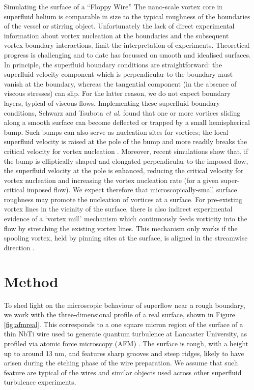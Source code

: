 \begin{chapter}{\label{cha:afm}Simulating the surface of a ``Floppy Wire''}
The nano-scale vortex core in superfluid helium is comparable in size 
to the typical roughness of the boundaries of the vessel or stirring object. 
Unfortunately the lack of direct experimental information about vortex 
nucleation at the boundaries and the subsequent vortex-boundary interactions,
limit the interpretation of experiments. Theoretical
progress is challenging and to date has focussed on smooth and idealised surfaces.  In principle, the superfluid boundary conditions
are straightforward:
the superfluid velocity
component which is perpendicular to the boundary must vanish
at the boundary, whereas the tangential component (in the absence of
viscous stresses) can slip.  For the latter reason, we do not expect boundary layers,
typical of viscous flows.   
Implementing these {superfluid} boundary conditions, 
Schwarz \cite{Schwarz-bump}
and Tsubota {\it et al.} \cite{PhysRevB.50.579}
found that one or more vortices sliding along a smooth surface
can become deflected or trapped by a small
hemispherical bump.  Such bumps can also serve as nucleation sites for vortices;  the local superfluid velocity is raised at the pole of the bump and more readily breaks the critical velocity for vortex nucleation \cite{win01}.  Moreover, recent simulations \cite{stagg_parker_14} show that, if
the bump is elliptically shaped and elongated perpendicular to the imposed flow, the superfluid velocity at the pole
is enhanced, reducing the critical velocity for vortex nucleation and increasing the vortex nucleation rate (for a given super-critical imposed flow). 
We expect therefore that microscopically-small surface roughness may promote the nucleation of vortices at a surface.
For pre-existing vortex lines in the vicinity of the surface, there is also indirect experimental evidence of a `vortex mill' mechanism 
which continuously feeds vorticity into the flow by stretching 
{the existing vortex} lines. This mechanism only works if the spooling vortex, 
held by pinning sites at the surface, is aligned in the streamwise direction \cite{PhysRevLett.64.1130}.

\section{Method\label{section:methodafm}}
To shed light on the microscopic behaviour of superflow near a rough
boundary, we work with the three-dimensional profile of a real surface, shown in Figure \ref{fig:afmreal}.  This corresponds to a one square micron region of the surface of a thin NbTi wire used to generate quantum turbulence at Lancaster University, as profiled via atomic force microscopy (AFM) \cite{Lawson}.  The surface is rough, with a height up to around 13 nm, and features sharp grooves and steep ridges, likely to have arisen during the etching phase of the wire preparation. We assume that such feature are typical of the wires and similar objects used across other superfluid turbulence experiments. 


\end{chapter}

